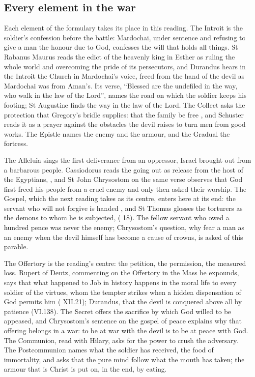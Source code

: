 \subsection{Every element in the war}

Each element of the formulary takes its place in this reading. The Introit is
the soldier's confession before the battle: Mardochai, under sentence and
refusing to give a man the honour due to God, confesses the will that holds
all things. St Rabanus Maurus reads the edict of the heavenly king in Esther as
ruling the whole world and overcoming the pride of its persecutors, and Durandus
hears in the Introit the Church in Mardochai's voice, freed from the hand of the
devil as Mardochai was from Aman's. Its verse, ``Blessed are the undefiled in the
way, who walk in the law of the Lord'', names the road on which the soldier keeps
his footing; St Augustine finds the way in the law of the Lord. The Collect asks
the protection that Gregory's bridle supplies: that the family be free , and Schuster reads it as a prayer against
the obstacles the devil raises to turn men from good works. The Epistle names
the enemy and the armour, and the Gradual the fortress.

The Alleluia sings the first deliverance from an oppressor, Israel brought out
from a barbarous people. Cassiodorus reads the going out as release from the
host of the Egyptians, , and St John Chrysostom
on the same verse observes that God first freed his people from a cruel enemy and
only then asked their worship. The Gospel, which the next reading takes as its
centre, enters here at its end: the servant who will not forgive is handed
, and St Thomas glosses the torturers as the demons to whom he
is subjected,  ( 18). The
fellow servant who owed a hundred pence was never the enemy; Chrysostom's
question, why fear a man as an enemy when the devil himself has become a cause of
crowns, is asked of this parable.

The Offertory is the reading's centre: the petition, the permission, the
measured loss. Rupert of Deutz, commenting on the Offertory in the Mass he
expounds, says that what happened to Job in history happens in the moral life to
every soldier of the virtues, whom the tempter strikes when a hidden
dispensation of God permits him ( XII.21); Durandus, that the devil is conquered above
all by patience (VI.138). The Secret offers the sacrifice by which God willed
to be appeased, and Chrysostom's sentence on the gospel of peace explains why
that offering belongs in a war: to be at war with the devil is to be at peace
with God. The Communion, read with Hilary, asks for the power to crush the
adversary. The Postcommunion names what the soldier has received, the food of
immortality, and asks that the pure mind follow what the mouth has taken; the
armour that is Christ is put on, in the end, by eating.

